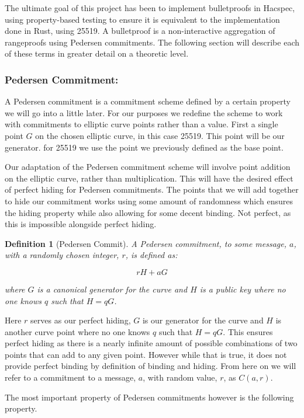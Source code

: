 \documentclass{article}
\newtheorem{definition}{Definition}[section]
\begin{document}
The ultimate goal of this project has been to implement bulletproofs in
Hacspec, using property-based testing to ensure it is equivalent to the
implementation done in Rust, using 25519. A bulletproof is a
non-interactive aggregation of rangeproofs using Pedersen commitments.
The following section will describe each of these terms in greater detail
on a theoretic level.

\subsubsection{Pedersen Commitment:}

A Pedersen commitment is a commitment scheme defined by a certain
property we will go into a little later. For our purposes we redefine
the scheme to work with commitments to elliptic curve points rather than
a value. First a single point $G$ on the chosen elliptic curve, in this
case 25519. This point will be our generator. for 25519 we use the point
we previously defined as the base point. 

Our adaptation of the Pedersen commitment scheme will involve point
addition on the elliptic curve, rather than multiplication. This will
have the desired effect of perfect hiding for Pedersen commitments. The
points that we will add together to hide our commitment works using some
amount of randomness which ensures the hiding property while also
allowing for some decent binding. Not perfect, as this is impossible
alongside perfect hiding. 

\begin{definition}[Pedersen Commit]
	A Pedersen commitment, to some message, $a$, with a randomly chosen
	integer, $r$, is defined as:

	$$rH + aG$$

	where $G$ is a canonical generator for the curve and $H$ is a public
	key where no one knows $q$ such that $H = qG$.
\end{definition}

Here $r$ serves as our perfect hiding, $G$ is our generator for the
curve and $H$ is another curve point where no one knows $q$ such that
$H = qG$. This ensures perfect hiding as there is a nearly infinite
amount of possible combinations of two points that can add to any given
point. However while that is true, it does not provide perfect binding by
definition of binding and hiding. From here on we will refer to a
commitment to a message, $a$, with random value, $r$, as $C(a,r)$.

The most important property of Pedersen commitments however is the
following property. 
\end{document}
